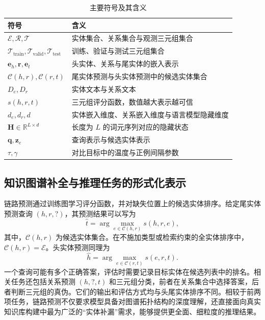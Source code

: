 \begin{table}[htbp]
    \centering
    \caption{主要符号及其含义}
    \label{tab:bg_notation}
    \begin{tabular}{p{}p{}}
        \toprule
        符号 & 含义 \\
        \midrule
        $\mathcal{E},\mathcal{R},\mathcal{T}$ & 实体集合、关系集合与观测三元组集合 \\
        $\mathcal{T}_{\mathrm{train}},\mathcal{T}_{\mathrm{valid}},\mathcal{T}_{\mathrm{test}}$ & 训练、验证与测试三元组集合 \\
        $\mathbf{e}_h,\mathbf{r},\mathbf{e}_t$ & 头实体、关系与尾实体的嵌入表示 \\
		$\mathcal{C}(h,r),\mathcal{C}(r,t)$ & 尾实体预测与头实体预测中的候选实体集合 \\
        $D_e,D_r$ & 实体文本与关系文本 \\
        $s(h,r,t)$ & 三元组评分函数，数值越大表示越可信 \\
        $d_e,d_r,d$ & 实体嵌入维度、关系嵌入维度与语言模型隐藏维度 \\
        $\mathbf{H}\in\mathbb{R}^{L\times d}$ & 长度为 $L$ 的词元序列对应的隐藏状态 \\
        $\mathbf{q},\mathbf{z}_e$ & 查询表示与候选实体表示 \\
        $\tau,\gamma$ & 对比目标中的温度与正例间隔参数 \\
        \bottomrule
    \end{tabular}
\end{table}

\subsection{知识图谱补全与推理任务的形式化表示}

链路预测通过训练图学习评分函数，并对缺失位置上的候选实体排序。给定尾实体预测查询 $(h,r,?)$，其预测结果可以写为
\begin{equation}
    \hat{t}=\arg\max_{e\in\mathcal{C}(h,r)}s(h,r,e),
    \label{eq:bg_tail_prediction}
\end{equation}
其中，$\mathcal{C}(h,r)$ 为候选实体集合。在不施加类型或检索约束的全实体排序中，$\mathcal{C}(h,r)=\mathcal{E}$。头实体预测同理为
\begin{equation}
    \hat{h}=\arg\max_{e\in\mathcal{C}(r,t)}s(e,r,t).
\end{equation}
一个查询可能有多个正确答案，评估时需要记录目标实体在候选列表中的排名\cite{bordes2013translating}。相关任务还包括关系预测 $(h,?,t)$ 和三元组分类，前者在关系集合中选择答案，后者判断三元组的真伪。它们的输出和评估方式均与头尾实体排序不同。相较于前两项任务，链路预测不仅要求模型具备对图谱拓扑结构的深度理解，还直接面向真实知识库构建中最为广泛的“实体补漏”需求，能够提供更全面、细粒度的推理结果。

